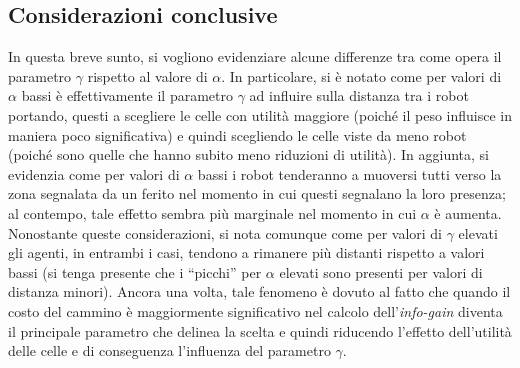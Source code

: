 \subsection{Considerazioni conclusive}
In questa breve sunto, si vogliono evidenziare alcune differenze tra come opera il parametro $\gamma$ rispetto al valore di $\alpha$.
In particolare, si è notato come per valori di $\alpha$ bassi è effettivamente il parametro $\gamma$ ad influire sulla distanza tra i robot portando, questi a scegliere le celle con utilità maggiore (poiché il peso influisce in maniera poco significativa) e quindi scegliendo le celle viste da meno robot (poiché sono quelle che hanno subito meno riduzioni di utilità).
In aggiunta, si evidenzia come per valori di $\alpha$ bassi i robot tenderanno a muoversi tutti verso la zona segnalata da un ferito nel momento in cui questi segnalano la loro presenza; al contempo, tale effetto sembra più marginale nel momento in cui $\alpha$ è aumenta.
Nonostante queste considerazioni, si nota comunque come per valori di $\gamma$ elevati gli agenti, in entrambi i casi, tendono a rimanere più distanti rispetto a valori bassi (si tenga presente che i “picchi” per $\alpha$ elevati sono presenti per valori di distanza minori).
Ancora una volta, tale fenomeno è dovuto al fatto che quando il costo del cammino è maggiormente significativo nel calcolo dell'\textit{info-gain} diventa il principale parametro che delinea la scelta e quindi riducendo l'effetto dell'utilità delle celle e di conseguenza l'influenza del parametro $\gamma$.
